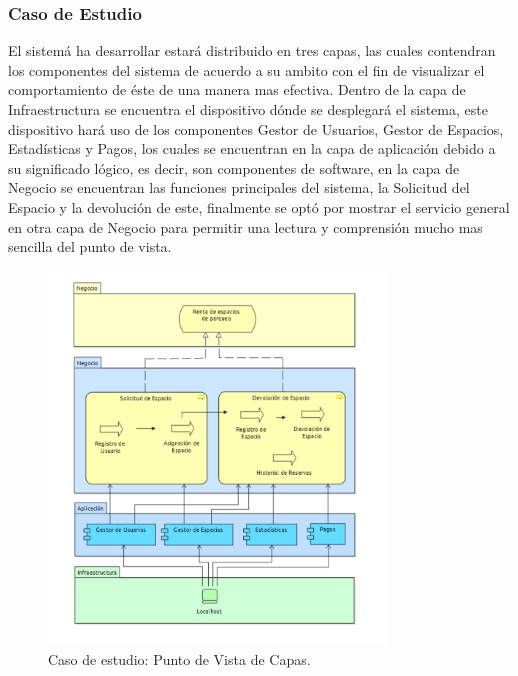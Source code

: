 \subsubsection{Caso de Estudio}
El sistemá ha desarrollar estará distribuido en tres capas, las cuales contendran los componentes del sistema de acuerdo a su ambito con el fin de visualizar el comportamiento de éste de una manera mas efectiva. Dentro de la capa de Infraestructura se encuentra el dispositivo dónde se desplegará el sistema, este dispositivo hará uso de los componentes Gestor de Usuarios, Gestor de Espacios, Estadísticas y Pagos, los cuales se encuentran en la capa de aplicación debido a su significado lógico, es decir, son componentes de software, en la capa de Negocio se encuentran las funciones principales del sistema, la Solicitud del Espacio y la devolución de este, finalmente se optó por mostrar el servicio general en otra capa de Negocio para permitir una lectura y comprensión mucho mas sencilla del punto de vista.
\begin{figure}[h]
	\centering
	\includegraphics[width=0.8\textwidth]{imagenes/Caso_Estudio/Tecnologia/capas_infraestructura.PDF}
	\caption{Caso de estudio: Punto de Vista de Capas.}
	\label{fig:gap_analysis}
\end{figure}

